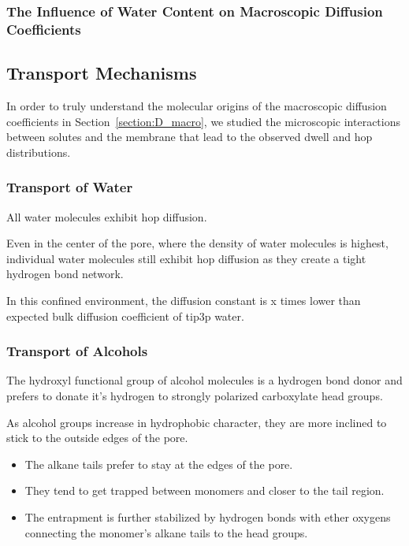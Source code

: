 \documentclass{article}
\begin{document}


  \subsubsection*{The Influence of Water Content on Macroscopic Diffusion Coefficients}

  \subsection{Transport Mechanisms}

  In order to truly understand the molecular origins of the macroscopic diffusion
  coefficients in Section~\ref{section:D_macro}, we studied the microscopic interactions
  between solutes and the membrane that lead to the observed dwell and hop distributions.

  \subsubsection*{Transport of Water}

  All water molecules exhibit hop diffusion.

  Even in the center of the pore, where the density of water molecules is 
  highest, individual water molecules still exhibit hop diffusion as they
  create a tight hydrogen bond network. 

  In this confined environment, the diffusion constant is x times lower than
  expected bulk diffusion coefficient of tip3p water.
  
  \subsubsection*{Transport of Alcohols}

  The hydroxyl functional group of alcohol molecules is a hydrogen bond donor
  and prefers to donate it's hydrogen to strongly polarized carboxylate head
  groups.

  As alcohol groups increase in hydrophobic character, they are more inclined
  to stick to the outside edges of the pore. 
  \begin{itemize}
	\item The alkane tails prefer to stay at the edges of the pore. 
	\item They tend to get trapped between monomers and closer to 
	the tail region. 
	\item The entrapment is further stabilized by hydrogen bonds with
	ether oxygens connecting the monomer's alkane tails to the head groups.
  \end{itemize}
\end{document}
